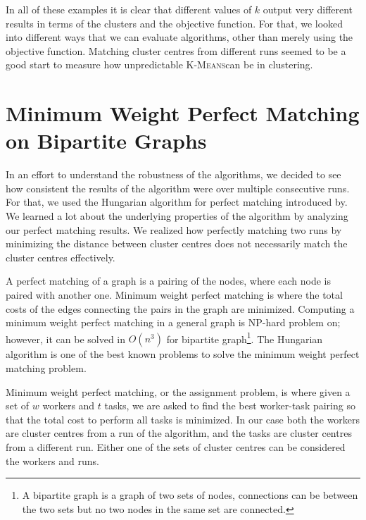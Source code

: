 \documentclass[12pt]{dalthesis}
\newcommand*{\kmeansn}{\textsc{K-Means}} %
\newcommand*{\kmeans}{\kmeansn } %
\begin{document}
In all of these examples it is clear that different values of $k$ output very different results in terms of the clusters and the objective function. For that, we looked into different ways that we can evaluate algorithms, other than merely using the objective function. Matching cluster centres from different runs seemed to be a good start to measure how unpredictable \kmeans can be in clustering. 

\section{Minimum Weight Perfect Matching on Bipartite Graphs}
In an effort to understand the robustness of the algorithms, we decided to see how consistent the results of the algorithm were over multiple consecutive runs. For that, we used the Hungarian algorithm for perfect matching introduced by\cite{kuhn}. We learned a lot about the underlying properties of the algorithm by analyzing our perfect matching results. We realized how perfectly matching two runs by minimizing the distance between cluster centres does not necessarily match the cluster centres effectively.

A perfect matching of a graph is a pairing of the nodes, where each node is paired with another one. Minimum weight perfect matching is where the total costs of the edges connecting the pairs in the graph are minimized. Computing a minimum weight perfect matching in a general graph is NP-hard problem on; however, it can be solved in $O(n^3)$ for bipartite graph\footnote{A bipartite graph is a graph of two sets of nodes, connections can be between the two sets but no two nodes in the same set are connected.}. The Hungarian algorithm is one of the best known problems to solve the minimum weight perfect matching problem.

Minimum weight perfect matching, or the assignment problem, is where given a set of $w$ workers and $t$ tasks, we are asked to find the best worker-task pairing so that the total cost to perform all tasks is minimized. In our case both the workers are cluster centres from a run of the algorithm, and the tasks are cluster centres from a different run. Either one of the sets of cluster centres can be considered the workers and runs.  
\end{document}

